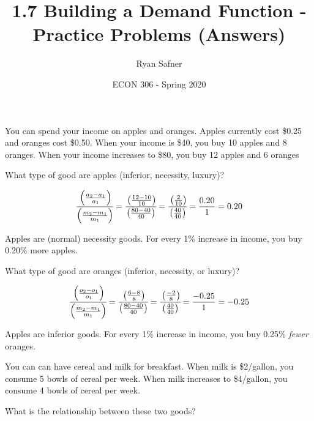 \documentclass[12 pt]{exam}
\title{1.7 Building a Demand Function - Practice Problems (Answers)}
\author{Ryan Safner}
\date{ECON 306 - Spring 2020}
\begin{document}
\maketitle

You can spend your income on apples and oranges. Apples currently cost \$0.25 and oranges cost \$0.50. When your income is \$40, you buy 10 apples and 8 oranges. When your income increases to \$80, you buy 12 apples and 6 oranges

\begin{questions}

\question What type of good are apples (inferior, necessity, luxury)?

\begin{solution}

\begin{equation*}
\displaystyle \cfrac{\left(\frac{a_2-a_1}{a_1}\right)}{\left(\frac{m_2-m_1}{m_1}\right)} = \cfrac{\left(\frac{12-10}{10}\right)}{\left(\frac{80-40}{40}\right)}=\cfrac{\left(\frac{2}{10}\right)}{\left(\frac{40}{40}\right)} = \frac{0.20}{1} = 0.20
\end{equation*}

Apples are (normal) necessity goods. For every 1\% increase in income, you buy 0.20\% more apples.

\end{solution}

\question What type of good are oranges (inferior, necessity, or luxury)?

\begin{solution}

\begin{equation*}
\displaystyle \cfrac{\left(\frac{o_2-o_1}{o_1}\right)}{\left(\frac{m_2-m_1}{m_1}\right)} = \cfrac{\left(\frac{6-8}{8}\right)}{\left(\frac{80-40}{40}\right)}=\cfrac{\left(\frac{-2}{8}\right)}{\left(\frac{40}{40}\right)} = \frac{-0.25}{1} = -0.25
\end{equation*}

Apples are inferior goods. For every 1\% increase in income, you buy 0.25\% \emph{fewer} oranges.

\end{solution}

\clearpage

You can can have cereal and milk for breakfast. When milk is \$2/gallon, you consume 5 bowls of cereal per week. When milk increases to \$4/gallon, you consume 4 bowls of cereal per week.

\question What is the relationship between these two goods?


\end{questions}
\end{document}
